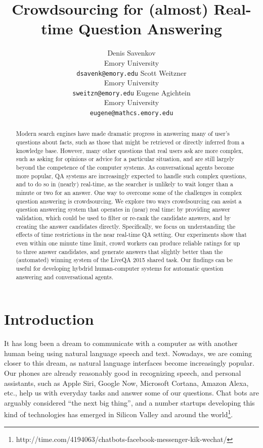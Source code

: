 \documentclass[11pt,letterpaper]{article}
\title{Crowdsourcing for (almost) Real-time Question Answering}
\author{Denis Savenkov \\ Emory University \\ {\tt dsavenk@emory.edu} 
  \And Scott Weitzner \\ Emory University \\ {\tt sweitzn@emory.edu}
  \And Eugene Agichtein \\ Emory University \\ {\tt eugene@mathcs.emory.edu}
}
\date{}
\begin{document}
\maketitle

\begin{abstract}

Modern search engines have made dramatic progress in answering many of user's questions about facts, such as those that might be retrieved or directly inferred from a knowledge base. However, many other questions that real users ask are more complex, such as asking for opinions or advice for a particular situation, and are still largely beyond the competence of the computer systems.
As conversational agents become more popular, QA systems are increasingly expected to handle such complex questions, and to do so in (nearly) real-time, as the searcher is unlikely to wait longer than a minute or two for an answer.
One way to overcome some of the challenges in complex question answering is crowdsourcing.
We explore two ways crowdsourcing can assist a question answering system that operates in (near) real time: by providing answer validation, which could be used to filter or re-rank the candidate answers, and by creating the answer candidates directly. Specifically, we focus on understanding the effects of time restrictions in the near real-time QA setting. Our experiments show that even within one minute time limit, crowd workers can produce reliable ratings for up to three answer candidates, and generate answers that slightly better than the (automated) winning system of the LiveQA 2015 shared task.
Our findings can be useful for developing hybdrid human-computer systems for automatic question answering and conversational agents.

\end{abstract}

\section{Introduction}
\label{sec:introduction}

It has long been a dream to communicate with a computer as with another human being using natural language speech and text.
Nowadays, we are coming closer to this dream, as natural language interfaces become increasingly popular.
Our phones are already reasonably good in recognizing speech, and personal assistants, such as Apple Siri, Google Now, Microsoft Cortana, Amazon Alexa, etc., help us with everyday tasks and answer some of our questions.
Chat bots are arguably considered ``the next big thing'', and a number startups developing this kind of technologies has emerged in Silicon Valley and around the world\footnote{http://time.com/4194063/chatbots-facebook-messenger-kik-wechat/}.
\end{document}
